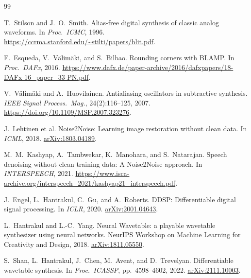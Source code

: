 \documentclass[10pt,twocolumn,letterpaper]{article}
\theoremstyle{remark}
\begin{document}
\FloatBarrier
\balance
{\footnotesize
\setlength{\baselineskip}{11.5pt}
\begin{thebibliography}{99}
\setlength{\itemsep}{0.25ex plus 0.05ex}
\setlength{\parsep}{0pt}
\setlength{\parskip}{0pt}

T.~Stilson and J.~O.~Smith.
\newblock Alias-free digital synthesis of classic analog waveforms.
\newblock In \emph{Proc.\ ICMC}, 1996.
\newblock \url{https://ccrma.stanford.edu/~stilti/papers/blit.pdf}.

F.~Esqueda, V.~V\"alim\"aki, and S.~Bilbao.
\newblock Rounding corners with BLAMP.
\newblock In \emph{Proc.\ DAFx}, 2016.
\newblock \url{https://www.dafx.de/paper-archive/2016/dafxpapers/18-DAFx-16_paper_33-PN.pdf}.

V.~V\"alim\"aki and A.~Huovilainen.
\newblock Antialiasing oscillators in subtractive synthesis.
\newblock \emph{IEEE Signal Process.\ Mag.}, 24(2):116--125, 2007.
\newblock \url{https://doi.org/10.1109/MSP.2007.323276}.

J.~Lehtinen et al.
\newblock Noise2Noise: Learning image restoration without clean data.
\newblock In \emph{ICML}, 2018.
\newblock \href{https://arxiv.org/abs/1803.04189}{arXiv:1803.04189}.

M.~M.~Kashyap, A.~Tambwekar, K.~Manohara, and S.~Natarajan.
\newblock Speech denoising without clean training data: A Noise2Noise approach.
\newblock In \emph{INTERSPEECH}, 2021.
\newblock \url{https://www.isca-archive.org/interspeech_2021/kashyap21_interspeech.pdf}.

J.~Engel, L.~Hantrakul, C.~Gu, and A.~Roberts.
\newblock DDSP: Differentiable digital signal processing.
\newblock In \emph{ICLR}, 2020.
\newblock \href{https://arxiv.org/abs/2001.04643}{arXiv:2001.04643}.

L.~Hantrakul and L.-C.~Yang.
\newblock Neural Wavetable: a playable wavetable synthesizer using neural networks.
\newblock NeurIPS Workshop on Machine Learning for Creativity and Design, 2018.
\newblock \href{https://arxiv.org/abs/1811.05550}{arXiv:1811.05550}.

S.~Shan, L.~Hantrakul, J.~Chen, M.~Avent, and D.~Trevelyan.
\newblock Differentiable wavetable synthesis.
\newblock In \emph{Proc.\ ICASSP}, pp.~4598--4602, 2022.
\newblock \href{https://arxiv.org/abs/2111.10003}{arXiv:2111.10003}.


\end{thebibliography}}
\end{document}

